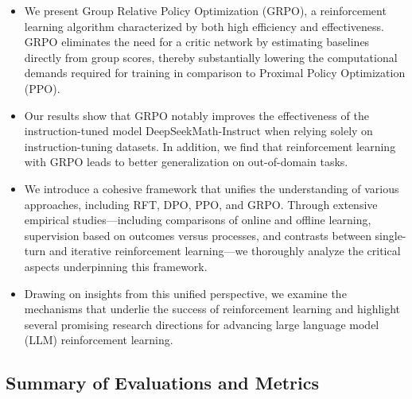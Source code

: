 \begin{itemize}[topsep=0pt]
    \item We present Group Relative Policy Optimization (GRPO), a reinforcement learning algorithm characterized by both high efficiency and effectiveness. GRPO eliminates the need for a critic network by estimating baselines directly from group scores, thereby substantially lowering the computational demands required for training in comparison to Proximal Policy Optimization (PPO).
    \item Our results show that GRPO notably improves the effectiveness of the instruction-tuned model DeepSeekMath-Instruct when relying solely on instruction-tuning datasets. In addition, we find that reinforcement learning with GRPO leads to better generalization on out-of-domain tasks.
    \item We introduce a cohesive framework that unifies the understanding of various approaches, including RFT, DPO, PPO, and GRPO. Through extensive empirical studies—including comparisons of online and offline learning, supervision based on outcomes versus processes, and contrasts between single-turn and iterative reinforcement learning—we thoroughly analyze the critical aspects underpinning this framework.
    \item Drawing on insights from this unified perspective, we examine the mechanisms that underlie the success of reinforcement learning and highlight several promising research directions for advancing large language model (LLM) reinforcement learning.
\end{itemize}

\subsection{Summary of Evaluations and Metrics}

